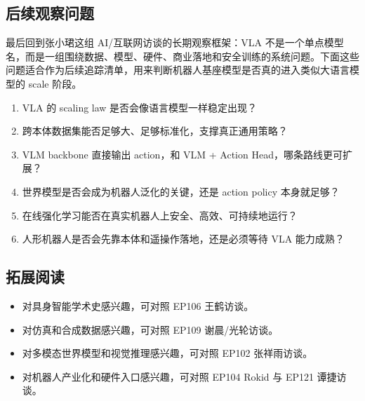 \subsection{后续观察问题}

最后回到张小珺这组 AI/互联网访谈的长期观察框架：VLA 不是一个单点模型名，而是一组围绕数据、模型、硬件、商业落地和安全训练的系统问题。下面这些问题适合作为后续追踪清单，用来判断机器人基座模型是否真的进入类似大语言模型的 scale 阶段。

\begin{enumerate}
\item VLA 的 scaling law 是否会像语言模型一样稳定出现？
\item 跨本体数据集能否足够大、足够标准化，支撑真正通用策略？
\item VLM backbone 直接输出 action，和 VLM + Action Head，哪条路线更可扩展？
\item 世界模型是否会成为机器人泛化的关键，还是 action policy 本身就足够？
\item 在线强化学习能否在真实机器人上安全、高效、可持续地运行？
\item 人形机器人是否会先靠本体和遥操作落地，还是必须等待 VLA 能力成熟？
\end{enumerate}

\subsection{拓展阅读}

\begin{itemize}
\item 对具身智能学术史感兴趣，可对照 EP106 王鹤访谈。
\item 对仿真和合成数据感兴趣，可对照 EP109 谢晨/光轮访谈。
\item 对多模态世界模型和视觉推理感兴趣，可对照 EP102 张祥雨访谈。
\item 对机器人产业化和硬件入口感兴趣，可对照 EP104 Rokid 与 EP121 谭捷访谈。
\end{itemize}



